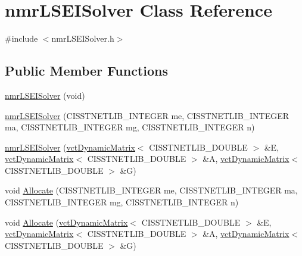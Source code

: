 \hypertarget{classnmr_l_s_e_i_solver}{\section{nmr\-L\-S\-E\-I\-Solver Class Reference}
\label{classnmr_l_s_e_i_solver}
}


{\ttfamily \#include $<$nmr\-L\-S\-E\-I\-Solver.\-h$>$}

\subsection*{Public Member Functions}
\begin{DoxyCompactItemize}
\item 
\hyperlink{classnmr_l_s_e_i_solver_a6e7f8748f3a8698d5de14e9b5040bbb5}{nmr\-L\-S\-E\-I\-Solver} (void)
\item 
\hyperlink{classnmr_l_s_e_i_solver_a058f80909183378dcb2da3981728304b}{nmr\-L\-S\-E\-I\-Solver} (C\-I\-S\-S\-T\-N\-E\-T\-L\-I\-B\-\_\-\-I\-N\-T\-E\-G\-E\-R me, C\-I\-S\-S\-T\-N\-E\-T\-L\-I\-B\-\_\-\-I\-N\-T\-E\-G\-E\-R ma, C\-I\-S\-S\-T\-N\-E\-T\-L\-I\-B\-\_\-\-I\-N\-T\-E\-G\-E\-R mg, C\-I\-S\-S\-T\-N\-E\-T\-L\-I\-B\-\_\-\-I\-N\-T\-E\-G\-E\-R n)
\item 
\hyperlink{classnmr_l_s_e_i_solver_aa9c31ea2a4b4db848a440455e13d7bb9}{nmr\-L\-S\-E\-I\-Solver} (\hyperlink{classvct_dynamic_matrix}{vct\-Dynamic\-Matrix}$<$ C\-I\-S\-S\-T\-N\-E\-T\-L\-I\-B\-\_\-\-D\-O\-U\-B\-L\-E $>$ \&E, \hyperlink{classvct_dynamic_matrix}{vct\-Dynamic\-Matrix}$<$ C\-I\-S\-S\-T\-N\-E\-T\-L\-I\-B\-\_\-\-D\-O\-U\-B\-L\-E $>$ \&A, \hyperlink{classvct_dynamic_matrix}{vct\-Dynamic\-Matrix}$<$ C\-I\-S\-S\-T\-N\-E\-T\-L\-I\-B\-\_\-\-D\-O\-U\-B\-L\-E $>$ \&G)
\item 
void \hyperlink{classnmr_l_s_e_i_solver_a73eefde3e072df37fc2ed0f3861a022f}{Allocate} (C\-I\-S\-S\-T\-N\-E\-T\-L\-I\-B\-\_\-\-I\-N\-T\-E\-G\-E\-R me, C\-I\-S\-S\-T\-N\-E\-T\-L\-I\-B\-\_\-\-I\-N\-T\-E\-G\-E\-R ma, C\-I\-S\-S\-T\-N\-E\-T\-L\-I\-B\-\_\-\-I\-N\-T\-E\-G\-E\-R mg, C\-I\-S\-S\-T\-N\-E\-T\-L\-I\-B\-\_\-\-I\-N\-T\-E\-G\-E\-R n)
\item 
void \hyperlink{classnmr_l_s_e_i_solver_a25ef0163be6aaf1adc2f91b7aa9a49d2}{Allocate} (\hyperlink{classvct_dynamic_matrix}{vct\-Dynamic\-Matrix}$<$ C\-I\-S\-S\-T\-N\-E\-T\-L\-I\-B\-\_\-\-D\-O\-U\-B\-L\-E $>$ \&E, \hyperlink{classvct_dynamic_matrix}{vct\-Dynamic\-Matrix}$<$ C\-I\-S\-S\-T\-N\-E\-T\-L\-I\-B\-\_\-\-D\-O\-U\-B\-L\-E $>$ \&A, \hyperlink{classvct_dynamic_matrix}{vct\-Dynamic\-Matrix}$<$ C\-I\-S\-S\-T\-N\-E\-T\-L\-I\-B\-\_\-\-D\-O\-U\-B\-L\-E $>$ \&G)

\end{DoxyCompactItemize}

